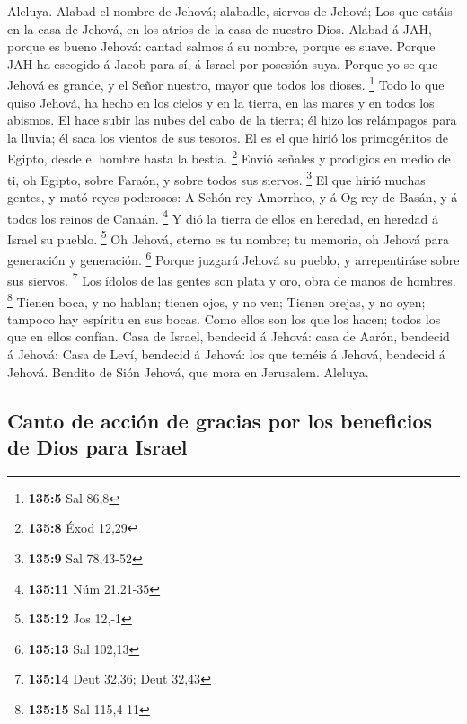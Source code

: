  Aleluya. Alabad el nombre de Jehová; alabadle, siervos de
Jehová;  Los que estáis en la casa de Jehová, en los atrios
de la casa de nuestro Dios.  Alabad á JAH, porque es bueno
Jehová: cantad salmos á su nombre, porque es suave.  Porque
JAH ha escogido á Jacob para sí, á Israel por posesión suya.
 Porque yo se que Jehová es grande, y el Señor nuestro,
mayor que todos los dioses. \footnote{\textbf{135:5} Sal 86,8}
 Todo lo que quiso Jehová, ha hecho en los cielos y en la
tierra, en las mares y en todos los abismos.  El hace subir
las nubes del cabo de la tierra; él hizo los relámpagos para la lluvia;
él saca los vientos de sus tesoros.  El es el que hirió los
primogénitos de Egipto, desde el hombre hasta la bestia. \footnote{\textbf{135:8}
  Éxod 12,29}  Envió señales y prodigios en medio de ti, oh
Egipto, sobre Faraón, y sobre todos sus siervos. \footnote{\textbf{135:9}
  Sal 78,43-52}  El que hirió muchas gentes, y mató reyes
poderosos:  A Sehón rey Amorrheo, y á Og rey de Basán, y á
todos los reinos de Canaán. \footnote{\textbf{135:11} Núm 21,21-35}
 Y dió la tierra de ellos en heredad, en heredad á Israel
su pueblo. \footnote{\textbf{135:12} Jos 12,-1}  Oh Jehová,
eterno es tu nombre; tu memoria, oh Jehová para generación y generación.
\footnote{\textbf{135:13} Sal 102,13}  Porque juzgará
Jehová su pueblo, y arrepentiráse sobre sus siervos. \footnote{\textbf{135:14}
  Deut 32,36; Deut 32,43}  Los ídolos de las gentes son
plata y oro, obra de manos de hombres. \footnote{\textbf{135:15} Sal
  115,4-11}  Tienen boca, y no hablan; tienen ojos, y no
ven;  Tienen orejas, y no oyen; tampoco hay espíritu en sus
bocas.  Como ellos son los que los hacen; todos los que en
ellos confían.  Casa de Israel, bendecid á Jehová: casa de
Aarón, bendecid á Jehová:  Casa de Leví, bendecid á Jehová:
los que teméis á Jehová, bendecid á Jehová.  Bendito de
Sión Jehová, que mora en Jerusalem. Aleluya.

\hypertarget{canto-de-acciuxf3n-de-gracias-por-los-beneficios-de-dios-para-israel}{%
\subsection{Canto de acción de gracias por los beneficios de Dios para
Israel}\label{canto-de-acciuxf3n-de-gracias-por-los-beneficios-de-dios-para-israel}}

